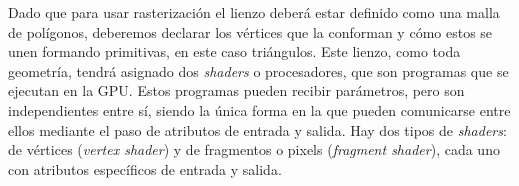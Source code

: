     
    
    
    
Dado que para usar rasterización el lienzo deberá estar definido como una malla de polígonos, deberemos declarar los vértices que la conforman y cómo estos se unen formando primitivas, en este caso triángulos. Este lienzo, como toda geometría, tendrá asignado dos \textit{shaders} o procesadores, que son programas que se ejecutan en la GPU. Estos programas pueden recibir parámetros, pero son independientes entre sí, siendo la única forma en la que pueden comunicarse entre ellos mediante el paso de atributos de entrada y salida. Hay dos tipos de \textit{shaders}: de vértices (\textit{vertex shader}) y de fragmentos o pixels (\textit{fragment shader}), cada uno con atributos específicos de entrada y salida.\newline

